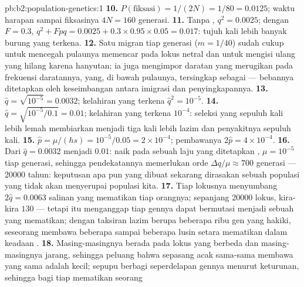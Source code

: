 \begin{solution}{pb:b2:population-genetics:1}
\textbf{10.} $P(\text{fiksasi}) = 1/(2N) = 1/80 = 0.0125$; waktu
harapan sampai fiksasinya $4N = 160$ generasi.
\textbf{11.} Tanpa , $q^{2} = 0.0025$; dengan $F = 0.3$,
$q^{2} + Fpq = 0.0025 + 0.3\times 0.95\times 0.05 = 0.017$: tujuh kali
lebih banyak burung yang terkena.
\textbf{12.} Satu migran tiap generasi ($m = 1/40$) sudah cukup untuk
mencegah pulaunya memencar pada lokus netral dan untuk mengisi ulang
 yang hilang karena hanyutan; ia juga mengimpor  daratan yang
merugikan pada frekuensi daratannya, yang, di bawah 
pulaunya, tersingkap sebagai  --- bebannya ditetapkan oleh
keseimbangan antara imigrasi dan penyingkapannya.
\textbf{13.} $\hat q = \sqrt{10^{-5}} = 0.0032$; kelahiran yang terkena
$\hat
q^{2} = 10^{-5}$.
\textbf{14.} $\hat q = \sqrt{10^{-5}/0.1} = 0.01$; kelahiran yang
terkena $10^{-4}$: seleksi yang sepuluh kali lebih lemah membiarkan
 menjadi tiga kali lebih lazim dan penyakitnya sepuluh kali.
\textbf{15.} $\hat p = \mu/(hs) = 10^{-5}/0.05 = 2\times 10^{-4}$;
pembawanya $2\hat p = 4\times 10^{-4}$.
\textbf{16.} Dari $\hat q = 0.0032$ menjadi $0.01$:  naik pada
sebuah laju yang ditetapkan , $\mu = 10^{-5}$ tiap generasi,
sehingga pendekatannya memerlukan orde $\Delta q/\mu \approx 700$
generasi --- \num{20000} tahun: keputusan apa pun yang dibuat sekarang
dirasakan sebuah populasi yang tidak akan menyerupai populasi kita.
\textbf{17.} Tiap lokusnya menyumbang $2\hat q = 0.0063$ salinan yang
mematikan tiap orangnya; sepanjang \num{20000} lokus, kira-kira $130$
--- tetapi itu menganggap tiap gennya dapat bermutasi menjadi sebuah
  yang mematikan; dengan taksiran lazim berupa beberapa ribu
gen yang hakiki, seseorang membawa beberapa sampai beberapa lusin
setara mematikan dalam keadaan .
\textbf{18.} Masing-masingnya berada pada lokus yang berbeda dan
masing-masingnya jarang, sehingga peluang bahwa sepasang acak
sama-sama membawa yang sama adalah kecil; sepupu berbagi seperdelapan
gennya menurut keturunan, sehingga bagi tiap  mematikan seorang

\end{solution}
